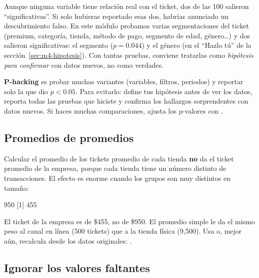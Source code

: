 Aunque ninguna variable tiene relación real con el ticket, dos de las 100
salieron ``significativas''. Si solo hubieras reportado esas dos, habrías
anunciado un descubrimiento falso. En este módulo probamos varias
segmentaciones del ticket (premium, categoría, tienda, método de pago,
segmento de edad, género\ldots) y dos salieron significativas: el segmento
($p = 0.044$) y el género (en el ``Hazlo tú'' de la
sección~\ref{sec:m4-hipotesis}). Con tantas pruebas, conviene tratarlas como
\emph{hipótesis para confirmar} con datos nuevos, no como verdades.

\begin{advertencia}
\textbf{P-hacking} es probar muchas variantes (variables, filtros, periodos)
y reportar solo la que dio $p < 0.05$. Para evitarlo: define tus hipótesis
antes de ver los datos, reporta todas las pruebas que hiciste y confirma los
hallazgos sorprendentes con datos nuevos. Si haces muchas comparaciones,
ajusta los p-valores con .
\end{advertencia}

\subsection{Promedios de promedios}

Calcular el promedio de los tickets promedio de cada tienda \textbf{no} da el
ticket promedio de la empresa, porque cada tienda tiene un número distinto de
transacciones. El efecto es enorme cuando los grupos son muy distintos en
tamaño:

\begin{rsalida}
[1] 950
[1] 455
\end{rsalida}

El ticket de la empresa es de \$455, no de \$950. El promedio simple le da el
mismo peso al canal en línea (500 tickets) que a la tienda física (9,500).
Usa  o, mejor aún, recalcula desde los datos
originales: .

\subsection{Ignorar los valores faltantes}

